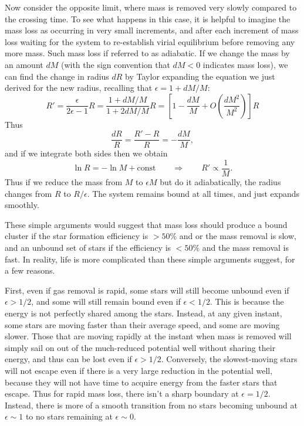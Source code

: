 Now consider the opposite limit, where mass is removed very slowly compared to the crossing time. To see what happens in this case, it is helpful to imagine the mass loss as occurring in very small increments, and after each increment of mass loss waiting for the system to re-establish virial equilibrium before removing any more mass. Such mass loss if referred to as adiabatic. If we change the mass by an amount $dM$ (with the sign convention that $dM < 0$ indicates mass loss), we can find the change in radius $dR$ by Taylor expanding the equation we just derived for the new radius, recalling that $\epsilon = 1 + dM/M$:
\begin{equation}
R' = \frac{\epsilon}{2\epsilon-1} R = \frac{1 + dM/M}{1 + 2 dM/M} R = \left[1 - \frac{dM}{M} + O\left(\frac{dM^2}{M^2}\right)\right] R
\end{equation}
Thus
\begin{equation}
\frac{dR}{R} = \frac{R' - R}{R} = -\frac{dM}{M},
\end{equation}
and if we integrate both sides then we obtain
\begin{equation}
\ln R = -\ln M + \mbox{const} \qquad\Longrightarrow\qquad R' \propto \frac{1}{M}.
\end{equation}
Thus if we reduce the mass from $M$ to $\epsilon M$ but do it adiabatically, the radius changes from $R$ to $R/\epsilon$. The system remains bound at all times, and just expands smoothly.

These simple arguments would suggest that mass loss should produce a bound cluster if the star formation efficiency is $>50\%$ and or the mass removal is slow, and an unbound set of stars if the efficiency is $<50\%$ and the mass removal is fast. In reality, life is more complicated than these simple arguments suggest, for a few reasons.

First, even if gas removal is rapid, some stars will still become unbound even if $\epsilon > 1/2$, and some will still remain bound even if $\epsilon < 1/2$. This is because the energy is not perfectly shared among the stars. Instead, at any given instant, some stars are moving faster than their average speed, and some are moving slower. Those that are moving rapidly at the instant when mass is removed will simply sail on out of the much-reduced potential well without sharing their energy, and thus can be lost even if $\epsilon > 1/2$. Conversely, the slowest-moving stars will not escape even if there is a very large reduction in the potential well, because they will not have time to acquire energy from the faster stars that escape. Thus for rapid mass loss, there isn't a sharp boundary at $\epsilon = 1/2$. Instead, there is more of a smooth transition from no stars becoming unbound at $\epsilon \sim 1$ to no stars remaining at $\epsilon \sim 0$.

